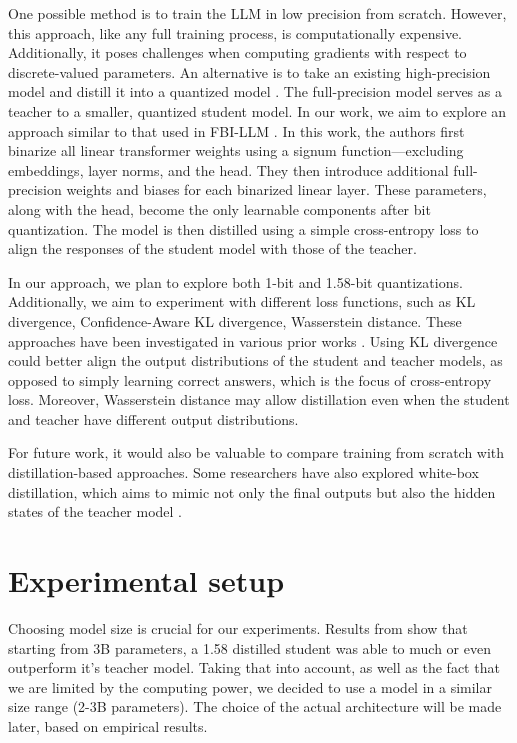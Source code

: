 \documentclass{article}
\begin{document}
One possible method is to train the LLM in low precision from scratch. However, this approach, like any full training process, is
computationally expensive. Additionally, it poses challenges when computing gradients with respect to discrete-valued parameters.
An alternative is to take an existing high-precision model and distill it into a quantized model
\cite{du2024bitdistillerunleashingpotentialsub4bit}. The full-precision model serves as a teacher to a smaller, quantized student model. 
In our work, we aim to explore an approach similar to that used in FBI-LLM \cite{fbillm}. In this work, the authors first binarize all 
linear transformer weights using a signum function—excluding embeddings, layer norms, and the head. They then introduce additional 
full-precision weights and biases for each binarized linear layer. These parameters, along with the head, become the only learnable 
components after bit quantization. The model is then distilled using a simple cross-entropy loss to align the responses of the student 
model with those of the teacher.

In our approach, we plan to explore both 1-bit and 1.58-bit quantizations. Additionally, we aim to experiment with different loss 
functions, such as KL divergence, Confidence-Aware KL divergence, Wasserstein distance. These approaches have been investigated in various
prior works \cite{boizard2025crosstokenizerdistillationuniversallogit, du2024bitdistillerunleashingpotentialsub4bit}. Using KL divergence 
could better align the output distributions of the student and teacher models, as opposed to simply learning correct answers, which is 
the focus of cross-entropy loss. Moreover, Wasserstein distance may allow distillation even when the student and teacher have different 
output distributions.

For future work, it would also be valuable to compare training from scratch with distillation-based approaches. Some researchers 
have also explored white-box distillation, which aims to mimic not only the final outputs but also the hidden states of the teacher 
model \cite{gu2024minillmknowledgedistillationlarge}.

\section{Experimental setup}

Choosing model size is crucial for our experiments. Results from \cite{ma2024era1bitllmslarge} show that starting from 3B parameters, a 1.58 distilled student was able to much or even outperform it's teacher model. Taking that into account, as well as the fact that we are limited by the computing power, we decided to use a model in a similar size range (2-3B parameters). The choice of the actual architecture will be made later, based on empirical results.
\end{document}
